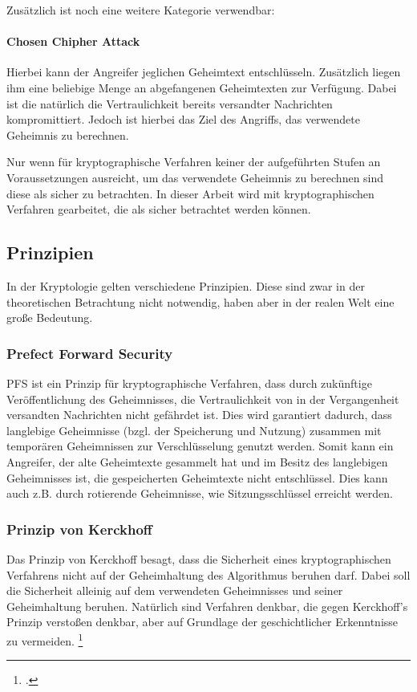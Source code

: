         Zusätzlich ist noch eine weitere Kategorie verwendbar:
        \paragraph{Chosen Chipher Attack}
            Hierbei kann der Angreifer jeglichen Geheimtext entschlüsseln. Zusätzlich liegen ihm eine beliebige Menge an abgefangenen Geheimtexten zur Verfügung. Dabei ist die natürlich die Vertraulichkeit bereits versandter Nachrichten kompromittiert. Jedoch ist hierbei das Ziel des Angriffs, das verwendete Geheimnis zu berechnen.
            
        Nur wenn für kryptographische Verfahren keiner der aufgeführten Stufen an Voraussetzungen ausreicht, um das verwendete Geheimnis zu berechnen sind diese als sicher zu betrachten. In dieser Arbeit wird mit kryptographischen Verfahren gearbeitet, die als sicher betrachtet werden können.

    \subsection{Prinzipien}
        In der Kryptologie gelten verschiedene Prinzipien. Diese sind zwar in der theoretischen Betrachtung nicht notwendig, haben aber in der realen Welt eine große Bedeutung.

        \subsubsection{Prefect Forward Security}
            \ac{PFS} ist ein Prinzip für kryptographische Verfahren, dass durch zukünftige Veröffentlichung des Geheimnisses, die Vertraulichkeit von in der Vergangenheit versandten Nachrichten nicht gefährdet ist. Dies wird garantiert dadurch, dass langlebige Geheimnisse (bzgl. der Speicherung und Nutzung) zusammen mit temporären Geheimnissen zur Verschlüsselung genutzt werden. Somit kann ein Angreifer, der alte Geheimtexte gesammelt hat und im Besitz des langlebigen Geheimnisses ist, die gespeicherten Geheimtexte nicht entschlüssel. Dies kann auch z.B. durch rotierende Geheimnisse, wie Sitzungsschlüssel erreicht werden.  

        \subsubsection{Prinzip von Kerckhoff}
            Das Prinzip von Kerckhoff besagt, dass die Sicherheit eines kryptographischen Verfahrens nicht auf der Geheimhaltung des Algorithmus beruhen darf. Dabei soll die Sicherheit alleinig auf dem verwendeten Geheimnisses und seiner Geheimhaltung beruhen. Natürlich sind Verfahren denkbar, die gegen Kerckhoff's Prinzip verstoßen denkbar, aber auf Grundlage der geschichtlicher Erkenntnisse zu vermeiden. \footcite[19]{Beutelspacher.2015}


